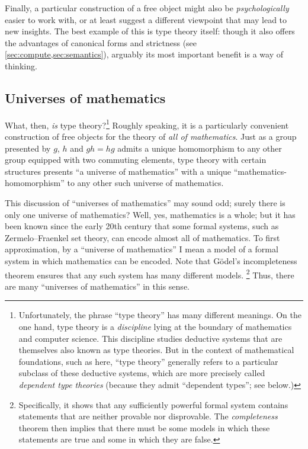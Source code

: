 \documentclass[10pt]{article}
\numberwithin{equation}{section}
\begin{document}
Finally, a particular construction of a free object might also be \emph{psychologically} easier to work with, or at least suggest a different viewpoint that may lead to new insights.
The best example of this is type theory itself: though it also offers the advantages of canonical forms and strictness (see \cref{sec:compute,sec:semantics}), arguably its most important benefit is a way of thinking.


\subsection{Universes of mathematics}
\label{sec:univ-math}

What, then, \emph{is} type theory?\footnote{\label{fn:typetheory}Unfortunately, the phrase ``type theory'' has many different meanings.
On the one hand, type theory is a \emph{discipline} lying at the boundary of mathematics and computer science.
This discipline studies deductive systems that are themselves also known as type theories.
But in the context of mathematical foundations, such as here, ``type theory'' generally refers to a particular subclass of these deductive systems, which are more precisely called \emph{dependent type theories} (because they admit ``dependent types''; see below.)}
Roughly speaking, it is a particularly convenient construction of free objects for the theory of \emph{all of mathematics}.
Just as a group presented by $g$, $h$ and $g h = h g$ admits a unique homomorphism to any other group equipped with two commuting elements, type theory with certain structures presents ``a universe of mathematics'' with a unique ``mathematics-homomorphism'' to any other such universe of mathematics.

This discussion of ``universes of mathematics'' may sound odd; surely there is only one universe of mathematics?
Well, yes, mathematics is a whole; but it has been known since the early 20th century that some formal systems, such as Zermelo--Fraenkel set theory, can encode almost all of mathematics. %
To first approximation, by a ``universe of mathematics'' I mean a model of a formal system in which mathematics can be encoded.
%
Note that G\"odel's incompleteness theorem ensures that any such system has many different models.%
\footnote{Specifically, it shows that any sufficiently powerful formal system contains statements that are neither provable nor disprovable.
The \emph{completeness} theorem then implies that there must be some models in which these statements are true and some in which they are false.}
Thus, there are many ``universes of mathematics'' in this sense.
\end{document}
